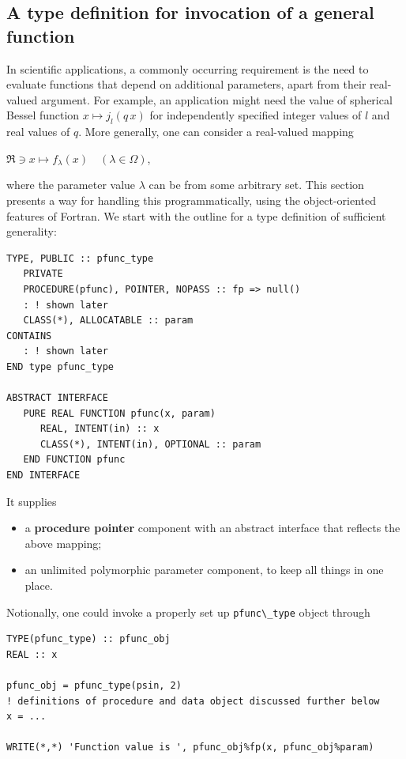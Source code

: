 \documentclass[
  paper=a4,
  ,captions=tableheading
]{scrartcl}
\newcommand{\passthrough}[1]{#1}
\providecommand{\tightlist}{%
  \setlength{\itemsep}{0pt}\setlength{\parskip}{0pt}}
\begin{document}
\subsection{A type definition for invocation of a general
function}\label{a-type-definition-for-invocation-of-a-general-function}

In scientific applications, a commonly occurring requirement is the need
to evaluate functions that depend on additional parameters, apart from
their real-valued argument. For example, an application might need the
value of spherical Bessel function \(x \mapsto j_l(q \, x)\) for
independently specified integer values of \(l\) and real values of
\(q\). More generally, one can consider a real-valued mapping

\(\Re \ni x \mapsto f_\lambda(x) \quad (\lambda \in \Omega)\),

where the parameter value \(\lambda\) can be from some arbitrary set.
This section presents a way for handling this programmatically, using
the object-oriented features of Fortran. We start with the outline for a
type definition of sufficient generality:

\begin{lstlisting}
TYPE, PUBLIC :: pfunc_type
   PRIVATE
   PROCEDURE(pfunc), POINTER, NOPASS :: fp => null()
   : ! shown later
   CLASS(*), ALLOCATABLE :: param
CONTAINS
   : ! shown later
END type pfunc_type

ABSTRACT INTERFACE
   PURE REAL FUNCTION pfunc(x, param)
      REAL, INTENT(in) :: x
      CLASS(*), INTENT(in), OPTIONAL :: param
   END FUNCTION pfunc
END INTERFACE
\end{lstlisting}

It supplies

\begin{itemize}
\tightlist
\item
  a \textbf{procedure pointer} component with an abstract interface that
  reflects the above mapping;
\item
  an unlimited polymorphic parameter component, to keep all things in
  one place.
\end{itemize}

Notionally, one could invoke a properly set up
\passthrough{\lstinline!pfunc\_type!} object through

\begin{lstlisting}
TYPE(pfunc_type) :: pfunc_obj
REAL :: x

pfunc_obj = pfunc_type(psin, 2)
! definitions of procedure and data object discussed further below
x = ...

WRITE(*,*) 'Function value is ', pfunc_obj%fp(x, pfunc_obj%param)
\end{lstlisting}
\end{document}
